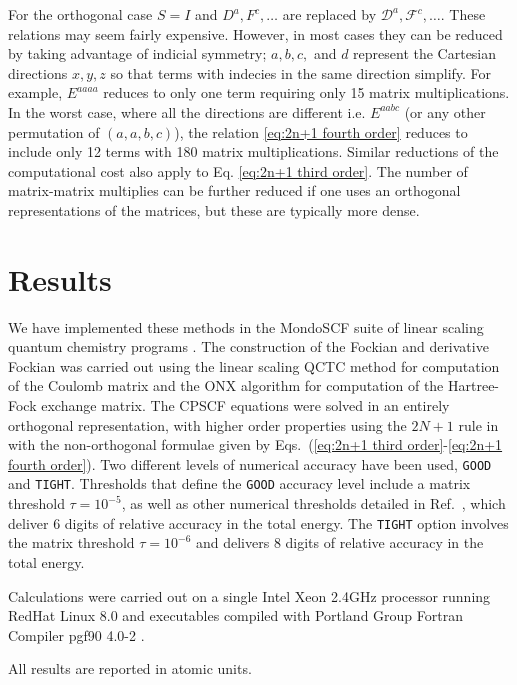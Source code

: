 \documentclass[prl,aps,letterpaper,twocolumn,showpacs,twocolumngrid,superbib]{revtex4}
\def\F{\mathcal{F}}
\def\D{\mathcal{D}}
\begin{document}
For the orthogonal case $S=I$ and $D^a,F^c,\ldots$ are replaced by $\D^a,\F^c,\ldots$.
These relations may seem fairly expensive. However, in most cases they
can be reduced by taking advantage of indicial symmetry; 
$a,b,c,$ and $d$ represent the Cartesian directions $x,y,z$
so that terms with indecies in the same direction simplify. 
For example, $E^{aaaa}$ reduces to only one term requiring only 15 matrix multiplications.
In the worst case, where all the directions are different i.e. $E^{aabc}$ 
(or any other permutation of $(a,a,b,c)$), the relation \eqref{eq:2n+1 fourth order} 
reduces to include only 12 terms with 180 matrix multiplications. 
Similar reductions of the computational cost also apply to 
Eq. \eqref{eq:2n+1 third order}. The number of matrix-matrix multiplies can be further reduced
if one uses an orthogonal representations of the matrices, but these are typically more dense. 

\newpage

\section{Results} \label{RESULTS}

We have implemented these methods in the MondoSCF suite of linear scaling quantum chemistry 
programs \cite{MondoSCF}.  The construction of the Fockian and derivative Fockian was carried
out using the linear scaling QCTC method for computation of the Coulomb matrix \cite{} and the
ONX algorithm \cite{} for computation of the Hartree-Fock exchange matrix. 
The CPSCF equations were solved in an entirely orthogonal representation,
with higher order properties using the $2 N+1$ rule in with the non-orthogonal formulae given
by Eqs.~(\ref{eq:2n+1 third order}-\ref{eq:2n+1 fourth order}).  Two different levels of numerical 
accuracy have been used, {\tt GOOD} and {\tt TIGHT}.   Thresholds that define the {\tt GOOD} 
accuracy level include a matrix threshold $\tau=10^{-5}$, as well as other numerical thresholds 
detailed in Ref.~, which deliver 6 digits of relative accuracy in the total 
energy.  The {\tt TIGHT} option involves the matrix threshold $\tau=10^{-6}$ and delivers 8 
digits of relative accuracy in the total energy.  

Calculations were carried out on a single Intel Xeon 2.4GHz processor running RedHat Linux 8.0 and  
executables compiled with Portland Group Fortran Compiler pgf90 4.0-2 \cite{PGF90}.

All results are reported in atomic units.
\end{document}
